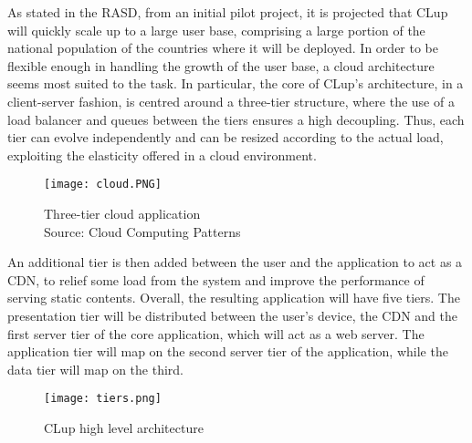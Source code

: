 \documentclass[../../main.tex]{subfiles}
\begin{document}
As stated in the RASD, from an initial pilot project, it is projected that CLup will quickly scale up to a large user base, 
comprising a large portion of the national population of the countries where it will be deployed. 
In order to be flexible enough in handling the growth of the user base, a cloud architecture seems most suited to the task. 
In particular, the core of CLup's architecture, in a client-server fashion, is centred around a three-tier structure, where the use of a load balancer 
and queues between the tiers ensures a high decoupling. 
Thus, each tier can evolve independently and can be resized according to the actual load, 
exploiting the elasticity offered in a cloud environment.

\begin{figure}[H]
    \centering
    \texttt{[image: cloud.PNG]}
    \caption{
        Three-tier cloud application\\
        Source: Cloud Computing Patterns
    }
\end{figure}

An additional tier is then added between the user and the application to act as a CDN, to relief some load from the system and improve the performance of serving static contents. Overall,
 the resulting application will have five tiers.
The presentation tier will be distributed between the user's device, the CDN and the first  server tier of the core application, which will act as a web server. The application tier will map on the second server tier of the application, while the data tier will map on the third.


\begin{figure}[H]
    \centering
    \texttt{[image: tiers.png]}
    \caption{
        CLup high level architecture
    }
\end{figure}
\end{document}
